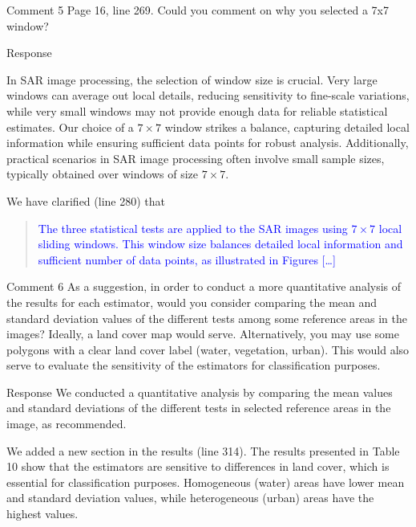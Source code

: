 \documentclass[11pt]{report}
\begin{document}
\vspace{3em}
\begin{reviewbox}{Comment 5}
Page 16, line 269. Could you comment on why you selected a 7x7 window?
\end{reviewbox}
\begin{responsebox}{Response}

In SAR image processing, the selection of window size is crucial. Very large windows can average out local details, reducing sensitivity to fine-scale variations, while very small windows may not provide enough data for reliable statistical estimates. Our choice of a $7\times 7$ window strikes a balance, capturing detailed local information while ensuring sufficient data points for robust analysis. Additionally, practical scenarios in SAR image processing often involve small sample sizes, typically obtained over windows of size $7\times 7$. 

We have clarified (line 280) that
\begin{quote}
	\textcolor{blue}{The three statistical tests are applied to the SAR images using $7\times 7$ local sliding windows.
		This window size balances detailed local information and sufficient number of data points, as illustrated in Figures [\dots]}
\end{quote}
\end{responsebox}

\vspace{3em}
\begin{reviewbox}{Comment 6}
As a suggestion, in order to conduct a more quantitative analysis of the results for each estimator, would you consider comparing the mean and standard deviation values of the different tests among some reference areas in the images? Ideally, a land cover map would serve. Alternatively, you may use some polygons with a clear land cover label (water, vegetation, urban). This would also serve to evaluate the sensitivity of the estimators for classification purposes.
\end{reviewbox}
\begin{responsebox}{Response}
We conducted a quantitative analysis by comparing the mean values and standard deviations of the different tests in selected reference areas in the image, as recommended.

 We added a new section in the results (line 314). The results presented in Table 10 show that the estimators are sensitive to differences in land cover, which is essential for classification purposes. Homogeneous (water) areas have lower mean and standard deviation values, while heterogeneous (urban) areas have the highest values.
	
	

\end{responsebox}
\end{document}
